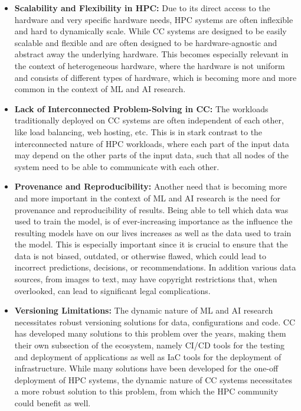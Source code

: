 \begin{itemize}
    \item \textbf{Scalability and Flexibility in \ac{HPC}:}
        Due to its direct access to the hardware and very specific hardware needs, \ac{HPC} systems are often inflexible and hard to dynamically scale. 
        While \ac{CC} systems are designed to be easily scalable and flexible and are often designed to be hardware-agnostic and abstract away the underlying hardware.
        This becomes especially relevant in the context of heterogeneous hardware, where the hardware is not uniform and consists of different types of hardware,
        which is becoming more and more common in the context of ML and AI research.
      
    \item \textbf{Lack of Interconnected Problem-Solving in \ac{CC}:} 
        The workloads traditionally deployed on \ac{CC} systems are often independent of each other, like load balancing, web hosting, etc. 
        This is in stark contrast to the interconnected nature of \ac{HPC} workloads, where each part of the input data may depend on the other parts of the input data,
        such that all nodes of the system need to be able to communicate with each other.

    \item \textbf{Provenance and Reproducibility:}
        Another need that is becoming more and more important in the context of ML and AI research is the need for provenance and reproducibility of results.
        Being able to tell which data was used to train the model, is of ever-increasing importance as the influence the resulting models have on our lives increases as well as the data used to train the model.
        This is especially important since it is crucial to ensure that the data is not biased, outdated, or otherwise flawed, which could lead to incorrect predictions, decisions, or recommendations. 
        In addition various data sources, from images to text, may have copyright restrictions that, when overlooked, can lead to significant legal complications.

    \item \textbf{Versioning Limitations:} 
        The dynamic nature of ML and AI research necessitates robust versioning solutions for data, configurations and code.
        \ac{CC} has developed many solutions to this problem over the years, making them their own subsection of the ecosystem,
        namely \ac{CI/CD} tools for the testing and deployment of applications as well as \ac{IaC} tools for the deployment of infrastructure.
        While many solutions have been developed for the one-off deployment of \ac{HPC} systems, the dynamic nature of \ac{CC} systems necessitates a more robust solution to this problem, 
        from which the \ac{HPC} community could benefit as well. 
        
\end{itemize}

